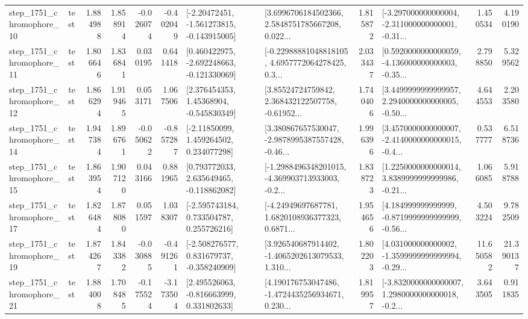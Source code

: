 \begin{tabular}{llrrrrllrlrr}
 step\_1751\_chromophore\_10 &      test &      1.884988 &    1.858914 &     -0.026074 & -0.402049 &   [-2.20472451, -1.561273815, -0.143915005] &  [3.6996706184502366, 2.5848751785667208, 0.022... &       1.815872 &  [-3.297000000000004, -2.311000000000001, -0.31... &            1.450534 &          4.190190 \\
 step\_1751\_chromophore\_11 &      test &      1.806646 &    1.836841 &      0.030195 &  0.641418 &   [0.460422975, -2.692248663, -0.121330069] &  [-0.22988881048818105, 4.6957772064278425, 0.3... &       2.033437 &  [0.5920000000000059, -4.136000000000003, -0.35... &            2.798850 &          5.329562 \\
 step\_1751\_chromophore\_12 &      test &      1.866294 &    1.919465 &      0.053171 &  1.067506 &     [2.376454353, 1.45368904, -0.545830349] &  [3.85524724759842, 2.368432122507758, -0.61952... &       1.740406 &  [3.4499999999999957, 2.2940000000000005, -0.50... &            4.644553 &          2.203580 \\
 step\_1751\_chromophore\_14 &      test &      1.947384 &    1.896761 &     -0.050622 & -0.857287 &     [-2.11850099, 1.459264502, 0.234077298] &  [3.380867657530047, -2.9878995387557428, -0.46... &       1.996396 &  [3.4570000000000007, -2.4140000000000015, -0.4... &            0.537777 &          6.518736 \\
 step\_1751\_chromophore\_15 &      test &      1.863954 &    1.907120 &      0.043166 &  0.881965 &    [0.793772033, 2.635649465, -0.118862082] &  [-1.2988496348201015, -4.369903713933003, -0.2... &       1.838723 &  [1.2250000000000014, 3.8389999999999986, -0.21... &            1.066085 &          5.918788 \\
 step\_1751\_chromophore\_17 &      test &      1.826484 &    1.878080 &      0.051597 &  1.038307 &    [-2.595743184, 0.733504787, 0.255726216] &  [-4.24949697687781, 1.6820108936377323, 0.6871... &       1.954656 &  [4.184999999999999, -0.8719999999999999, -0.56... &            4.503224 &          9.782509 \\
 step\_1751\_chromophore\_19 &      test &      1.874267 &    1.843382 &     -0.030885 & -0.491261 &   [-2.508276577, 0.831679737, -0.358240909] &  [3.926540687914402, -1.4065202613079533, 1.310... &       1.802203 &  [4.031000000000002, -1.3599999999999994, -0.29... &           11.650582 &         21.390137 \\
 step\_1751\_chromophore\_21 &      test &      1.884008 &    1.708485 &     -0.175524 & -3.173504 &    [2.495526063, -0.816663999, 0.331802633] &  [4.190176753047486, -1.4724435256934671, 0.230... &       1.819957 &  [-3.8320000000000007, 1.2980000000000018, -0.2... &            3.643505 &          0.911835 \\

\end{tabular}
